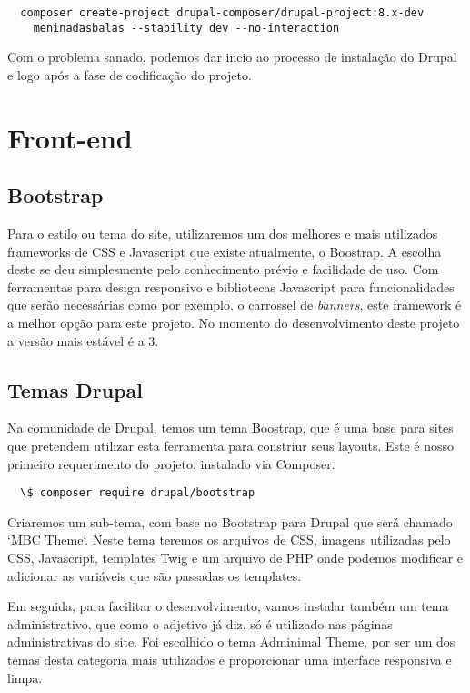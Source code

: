 \begin{lstlisting}
  composer create-project drupal-composer/drupal-project:8.x-dev 
    meninadasbalas --stability dev --no-interaction
\end{lstlisting}

Com o problema sanado, podemos dar incio ao processo de instalação do Drupal e logo após a fase de codificação do projeto.

\section{Front-end}

\subsection{Bootstrap}
Para o estilo ou tema do site, utilizaremos um dos melhores e mais utilizados frameworks de CSS e Javascript que existe atualmente, o Boostrap\cite{Bootstrap}. A escolha deste se deu simplesmente pelo conhecimento prévio e facilidade de uso. Com ferramentas para design responsivo e bibliotecas Javascript para funcionalidades que serão necessárias como por exemplo, o carrossel de \textit{banners}, este framework é a melhor opção para este projeto. No momento do desenvolvimento deste projeto a versão mais estável é a 3.

\subsection{Temas Drupal}
Na comunidade de Drupal, temos um tema Boostrap, que é uma base para sites que pretendem utilizar esta ferramenta para constriur seus layouts. Este é nosso primeiro requerimento do projeto, instalado via Composer.

\begin{lstlisting}
  \$ composer require drupal/bootstrap
\end{lstlisting}

Criaremos um sub-tema, com base no Bootstrap para Drupal que será chamado `MBC Theme`. Neste tema teremos os arquivos de CSS, imagens utilizadas pelo CSS, Javascript, templates Twig e um arquivo de PHP onde podemos modificar e adicionar as variáveis que são passadas os templates. 

Em seguida, para facilitar o desenvolvimento, vamos instalar também um tema administrativo, que como o adjetivo já diz, só é utilizado nas páginas administrativas do site. Foi escolhido o tema Adminimal Theme, por ser um dos temas desta categoria mais utilizados e proporcionar uma interface responsiva e limpa.

